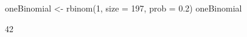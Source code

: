 \begin{Schunk}
\begin{Sinput}
  oneBinomial <- rbinom(1, size = 197, prob = 0.2)
  oneBinomial
\end{Sinput}
\begin{Soutput}
[1] 42
\end{Soutput}
\end{Schunk}
